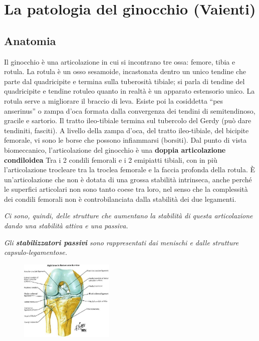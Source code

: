 \section{La patologia del ginocchio (Vaienti)}

\subsection{Anatomia}

Il ginocchio è una articolazione in cui si incontrano tre ossa: femore, tibia e rotula. La rotula è un osso sesamoide, incastonata dentro un unico tendine che parte dal quadricipite e termina sulla tuberosità
tibiale; si parla di tendine del quadricipite e tendine rotuleo quanto in realtà è un apparato estensorio unico.
La rotula serve a migliorare il braccio di leva. Esiste poi la cosiddetta ``pes anserinus'' o zampa d'oca formata dalla convergenza dei tendini di semitendinoso, gracile e sartorio. Il tratto ileo-tibiale termina sul tubercolo del Gerdy (può dare tendiniti, fasciti). A livello della zampa d'oca, del tratto ileo-tibiale, del bicipite femorale, vi sono le borse che possono infiammarsi (borsiti).
Dal punto di vista biomeccanico, l'articolazione del ginocchio è una \textbf{doppia articolazione condiloidea}
Tra i 2 condili femorali e i 2 emipiatti tibiali, con in più l'articolazione trocleare tra la troclea femorale e la faccia profonda della rotula.
È un'articolazione che non è dotata di una grossa stabilità intrinseca, anche perché le superfici articolari non sono tanto coese tra loro, nel senso che la complessità dei condili femorali non è controbilanciata dalla stabilità dei due legamenti.

\emph{Ci sono, quindi, delle strutture che aumentano la stabilità di questa articolazione dando una stabilità attiva e una passiva.}

\emph{Gli \textbf{stabilizzatori passivi} sono rappresentati dai menischi e dalle strutture capsulo-legamentose.}

\begin{figure}[!ht]
\centering
\includegraphics[width=0.4\textwidth]{009/image1.jpeg}
\end{figure}

